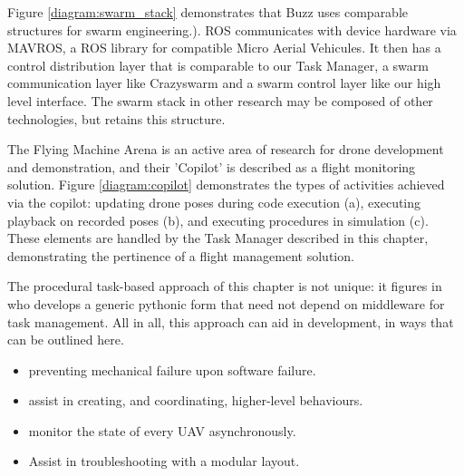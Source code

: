  Figure \ref{diagram:swarm_stack} demonstrates that Buzz uses comparable structures for swarm engineering.). ROS communicates with device hardware via MAVROS, a ROS library for compatible Micro Aerial Vehicules. It then has a control distribution layer that is comparable to our Task Manager, a swarm communication layer like Crazyswarm and a swarm control layer like our high level interface. The swarm stack in other research may be composed of other technologies, but retains this structure.

The Flying Machine Arena \cite{fma_paper} is an active area of research for drone development and demonstration, and their 'Copilot' is described as a flight monitoring solution. Figure \ref{diagram:copilot} demonstrates the types of activities achieved via the copilot: updating drone poses during code execution (a), executing playback on recorded poses (b), and executing procedures in simulation (c). These elements are handled by the Task Manager described in this chapter, demonstrating the pertinence of a flight management solution.


The procedural task-based approach of this chapter is not unique: it figures in \cite{pradalier_2020} who develops a generic pythonic form that need not depend on middleware for task management. All in all, this approach can aid in development, in ways that can be outlined here.
\begin{itemize}
    \item preventing mechanical failure upon software failure.
    \item assist in creating, and coordinating, higher-level behaviours.
    \item monitor the state of every UAV asynchronously.
    \item Assist in troubleshooting with a modular layout.
\end{itemize}

